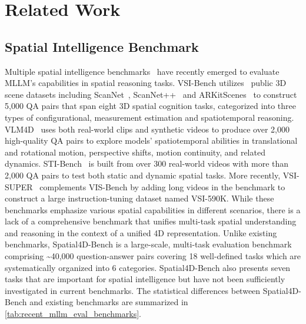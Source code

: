 \documentclass{article}
\begin{document}


\section{Related Work}
\label{sec:related_works}


\subsection{Spatial Intelligence Benchmark}
Multiple spatial intelligence benchmarks~\cite{Yang_2025_CVPR,yu2025far,liu2025mirage,gong2025space,deng2025internspatial,yang2025mmsi,ma20243dsrbench,cheng2024spatialrgpt,zhao2025mmvu,tang2025lego} have recently emerged to evaluate MLLM's capabilities in spatial reasoning tasks.
VSI-Bench utilizes~\cite{Yang_2025_CVPR} public 3D scene datasets including ScanNet~\cite{dai2017scannet}, ScanNet++~\cite{yeshwanth2023scannet++} and ARKitScenes~\cite{baruch2021arkitscenes} to construct 5,000 QA pairs that span eight 3D spatial cognition tasks, categorized into three types of configurational, measurement estimation and spatiotemporal reasoning.
VLM4D~\cite{zhou2025vlm4d} uses both real-world clips and synthetic videos to produce over 2,000 high-quality QA pairs to explore models' spatiotemporal abilities in translational and rotational motion, perspective shifts, motion continuity, and related dynamics.
STI-Bench~\cite{li2025sti} is built from over 300 real-world videos with more than 2,000 QA pairs to test both static and dynamic spatial tasks.
More recently, VSI-SUPER~\cite{yang2025cambrian} complements VIS-Bench by adding long videos in the benchmark to construct a large instruction-tuning dataset named VSI-590K.
While these benchmarks emphasize various spatial capabilities in different scenarios, there is a lack of a comprehensive benchmark that unifies multi-task spatial understanding and reasoning in the context of a unified 4D representation.
Unlike existing benchmarks, Spatial4D-Bench is a large-scale, multi-task evaluation benchmark comprising \textasciitilde40,000 question-answer pairs covering 18 well-defined tasks which are systematically organized into 6 categories.
Spatial4D-Bench also presents seven tasks that are important for spatial intelligence but have not been sufficiently investigated in current benchmarks.
The statistical differences between Spatial4D-Bench and existing benchmarks are summarized in \cref{tab:recent_mllm_eval_benchmarks}.
\end{document}
